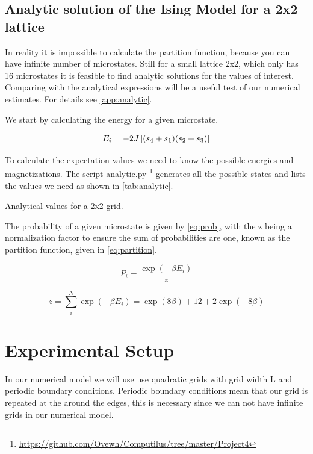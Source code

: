 \subsection{Analytic solution of the Ising Model for a 2x2 lattice}
In reality it is impossible to calculate the partition function, because you can
have infinite number of microstates. Still for a small lattice 2x2, which only
has 16 microstates it is
feasible to find analytic solutions for the values of
interest. Comparing with the analytical expressions will be a useful test of our
numerical estimates. For details see \cref{app:analytic}.

We start by calculating the energy for a given microstate.

\begin{equation}
  E_i = -2J\left[(s_4 + s_1)(s_2+s_3)\right]
\end{equation}

To calculate the expectation values we need to know the possible energies and
magnetizations. The script analytic.py
\footnote{\url{https://github.com/Ovewh/Computilus/tree/master/Project4}}
generates all the possible states and lists the values we need as shown in
\cref{tab:analytic}.

\begin{table}[htp]
  \centering
  \caption{Analytical values for a 2x2 grid.}
  \label{tab:analytic}
\end{table}

The probability of a given microstate is given by \cref{eq:prob}, with the z
being a normalization factor to ensure the sum of probabilities are one, known
as the partition function, given in \cref{eq:partition}.


\begin{equation}
  \label{eq:prob}
  P_i = \frac{\exp(-\beta E_i)}{z}
\end{equation}

\begin{equation}
  \label{eq:partition}
  z = \sum_{i}^{N} \exp(-\beta E_i) = \exp(8\beta) + 12 + 2\exp(-8\beta)
\end{equation}


\section{Experimental Setup}
In our numerical model we will use  use quadratic grids with grid width L and
periodic boundary conditions. Periodic boundary conditions mean that our grid is
repeated at the around the edges, this is necessary since we can not have
infinite grids in our numerical model.


